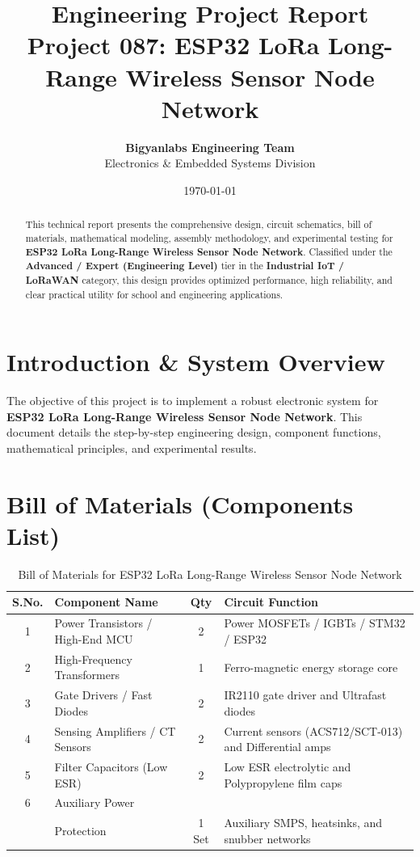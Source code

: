 \documentclass[11pt,a4paper]{article}
\title{\textbf{\Huge Engineering Project Report}\\[0.5em] \Large Project 087: ESP32 LoRa Long-Range Wireless Sensor Node Network}
\author{\textbf{Bigyanlabs Engineering Team}\\ Electronics \& Embedded Systems Division}
\date{\today}
\begin{document}
\maketitle
\thispagestyle{empty}

\begin{abstract}
This technical report presents the comprehensive design, circuit schematics, bill of materials, mathematical modeling, assembly methodology, and experimental testing for \textbf{ESP32 LoRa Long-Range Wireless Sensor Node Network}. Classified under the \textbf{Advanced / Expert (Engineering Level)} tier in the \textbf{Industrial IoT / LoRaWAN} category, this design provides optimized performance, high reliability, and clear practical utility for school and engineering applications.
\end{abstract}

\newpage
\tableofcontents
\newpage

\section{Introduction \& System Overview}
The objective of this project is to implement a robust electronic system for \textbf{ESP32 LoRa Long-Range Wireless Sensor Node Network}. This document details the step-by-step engineering design, component functions, mathematical principles, and experimental results.

\section{Bill of Materials (Components List)}
\begin{table}[h!]
\centering
\caption{Bill of Materials for ESP32 LoRa Long-Range Wireless Sensor Node Network}
\vspace{0.5em}
\begin{tabular}{clcp{7cm}}
\toprule
\textbf{S.No.} & \textbf{Component Name} & \textbf{Qty} & \textbf{Circuit Function} \\
\midrule
1 & Power Transistors / High-End MCU & 2 & Power MOSFETs / IGBTs / STM32 / ESP32 \\
2 & High-Frequency Transformers & 1 & Ferro-magnetic energy storage core \\
3 & Gate Drivers / Fast Diodes & 2 & IR2110 gate driver and Ultrafast diodes \\
4 & Sensing Amplifiers / CT Sensors & 2 & Current sensors (ACS712/SCT-013) and Differential amps \\
5 & Filter Capacitors (Low ESR) & 2 & Low ESR electrolytic and Polypropylene film caps \\
6 & Auxiliary Power \\& Protection & 1 Set & Auxiliary SMPS, heatsinks, and snubber networks \\
\bottomrule
\end{tabular}
\end{table}
\end{document}
